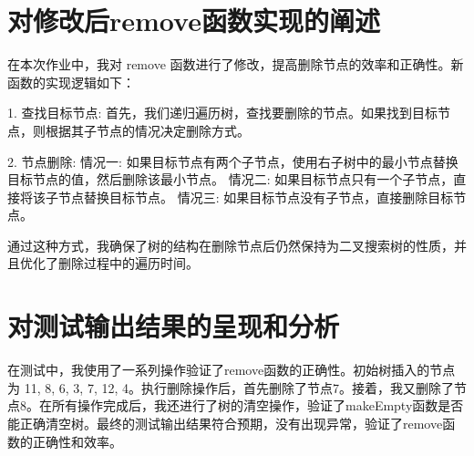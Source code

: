 \documentclass[UTF8]{ctexart}
\begin{document}
\pagestyle{fancy}
\fancyhead{}

\section{对修改后remove函数实现的阐述}

在本次作业中，我对 remove 函数进行了修改，提高删除节点的效率和正确性。新函数的实现逻辑如下：

1. 查找目标节点: 首先，我们递归遍历树，查找要删除的节点。如果找到目标节点，则根据其子节点的情况决定删除方式。

2. 节点删除:
   情况一: 如果目标节点有两个子节点，使用右子树中的最小节点替换目标节点的值，然后删除该最小节点。
   情况二: 如果目标节点只有一个子节点，直接将该子节点替换目标节点。
   情况三: 如果目标节点没有子节点，直接删除目标节点。

通过这种方式，我确保了树的结构在删除节点后仍然保持为二叉搜索树的性质，并且优化了删除过程中的遍历时间。

\section{对测试输出结果的呈现和分析}
在测试中，我使用了一系列操作验证了remove函数的正确性。初始树插入的节点为 11, 8, 6, 3, 7, 12, 4。执行删除操作后，首先删除了节点7。接着，我又删除了节点8。在所有操作完成后，我还进行了树的清空操作，验证了makeEmpty函数是否能正确清空树。最终的测试输出结果符合预期，没有出现异常，验证了remove函数的正确性和效率。
\end{document}
